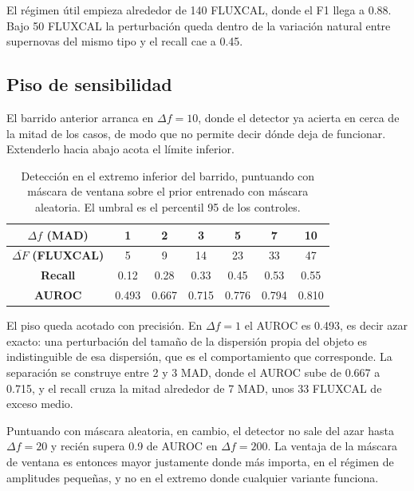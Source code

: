El régimen útil empieza alrededor de 140 FLUXCAL, donde el F1 llega a 0.88. Bajo 50 FLUXCAL la perturbación queda dentro de la variación natural entre supernovas del mismo tipo y el recall cae a 0.45.

\subsection{Piso de sensibilidad}
\label{sec:res_piso}

El barrido anterior arranca en $\Delta f = 10$, donde el detector ya acierta en cerca de la mitad de los casos, de modo que no permite decir dónde deja de funcionar. Extenderlo hacia abajo acota el límite inferior.

\begin{table}[H]
\centering
\begin{tabular}{|c|c|c|c|c|c|c|}
\hline
$\Delta f$ \textbf{(MAD)} & 1 & 2 & 3 & 5 & 7 & 10 \\
\hline
$\overline{\Delta F}$ \textbf{(FLUXCAL)} & 5 & 9 & 14 & 23 & 33 & 47 \\
\textbf{Recall} & 0.12 & 0.28 & 0.33 & 0.45 & 0.53 & 0.55 \\
\textbf{AUROC}  & 0.493 & 0.667 & 0.715 & 0.776 & 0.794 & 0.810 \\
\hline
\end{tabular}
\caption{Detección en el extremo inferior del barrido, puntuando con máscara de ventana sobre el prior entrenado con máscara aleatoria. El umbral es el percentil 95 de los controles.}
\label{tab:piso_sensibilidad}
\end{table}

El piso queda acotado con precisión. En $\Delta f = 1$ el AUROC es 0.493, es decir azar exacto: una perturbación del tamaño de la dispersión propia del objeto es indistinguible de esa dispersión, que es el comportamiento que corresponde. La separación se construye entre 2 y 3 MAD, donde el AUROC sube de 0.667 a 0.715, y el recall cruza la mitad alrededor de 7 MAD, unos 33 FLUXCAL de exceso medio.

Puntuando con máscara aleatoria, en cambio, el detector no sale del azar hasta $\Delta f = 20$ y recién supera 0.9 de AUROC en $\Delta f = 200$. La ventaja de la máscara de ventana es entonces mayor justamente donde más importa, en el régimen de amplitudes pequeñas, y no en el extremo donde cualquier variante funciona.

\begin{figure}[H]
\centering
{}
\end{figure}


